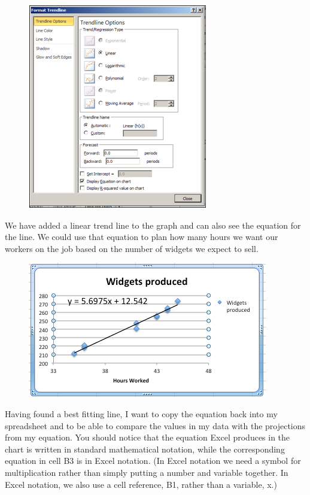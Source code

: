\documentclass[10pt,]{book}
\theoremstyle{plain}
\theoremstyle{definition}
\theoremstyle{definition}
\begin{document}
  \leavevmode%
\begin{figure}
\centering
\includegraphics[width=0.8\linewidth]{images/sec1-5-4.png}
\end{figure}
 

%
\par
We have added a linear trend line to the graph and can also see the equation for the line.  We could use that equation to plan how many hours we want our workers on the job based on the number of widgets we expect to sell.

  \leavevmode%
\begin{figure}
\centering
\includegraphics[width=0.8\linewidth]{images/sec1-5-5.png}
\end{figure}
 

%
\par
Having found a best fitting line, I want to copy the equation back into my spreadsheet and to be able to compare the values in my data with the projections from my equation.  You should notice that the equation Excel produces in the chart is written in standard mathematical notation, while the corresponding equation in cell B3 is in Excel notation.  (In Excel notation we need a symbol for multiplication rather than simply putting a number and variable together.  In Excel notation, we also use a cell reference, B1, rather than a variable, x.)
\end{document}
